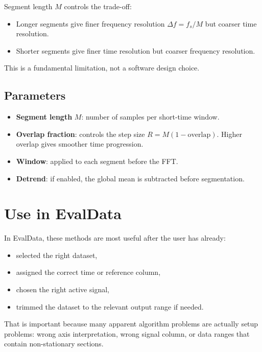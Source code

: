 \documentclass[11pt,a4paper]{article}
\begin{document}
Segment length $M$ controls the trade-off:

\begin{itemize}
    \item Longer segments give finer frequency resolution $\Delta f = f_s / M$ but coarser time resolution.
    \item Shorter segments give finer time resolution but coarser frequency resolution.
\end{itemize}

This is a fundamental limitation, not a software design choice.

\subsection{Parameters}

\begin{itemize}
    \item \textbf{Segment length} $M$: number of samples per short-time window.
    \item \textbf{Overlap fraction}: controls the step size $R = M(1 - \text{overlap})$. Higher overlap gives smoother time progression.
    \item \textbf{Window}: applied to each segment before the FFT.
    \item \textbf{Detrend}: if enabled, the global mean is subtracted before segmentation.
\end{itemize}

\section{Use in EvalData}

In EvalData, these methods are most useful after the user has already:

\begin{itemize}
    \item selected the right dataset,
    \item assigned the correct time or reference column,
    \item chosen the right active signal,
    \item trimmed the dataset to the relevant output range if needed.
\end{itemize}

That is important because many apparent algorithm problems are actually setup problems: wrong axis interpretation, wrong signal column, or data ranges that contain non-stationary sections.
\end{document}
